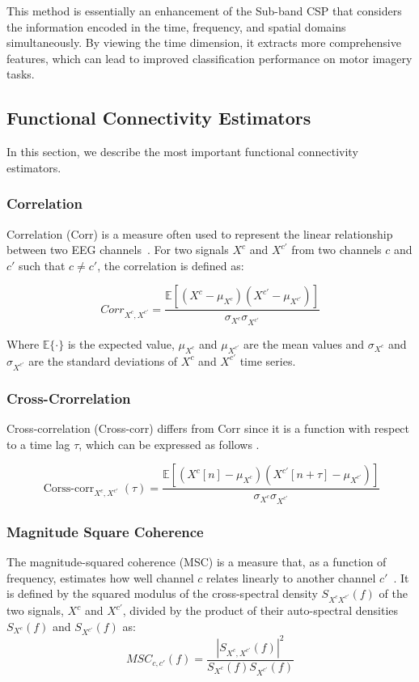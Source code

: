 This method is essentially an enhancement of the Sub-band CSP that considers the information encoded in the time, frequency, and spatial domains simultaneously. By viewing the time dimension, it extracts more comprehensive features, which can lead to improved classification performance on motor imagery tasks.


\subsection{Functional Connectivity Estimators}

In this section, we describe the most important functional connectivity estimators.

\subsubsection{Correlation}
Correlation (Corr) is a measure often used to represent the linear relationship between two EEG channels~\cite{fagerholm2020dynamic}. For two signals $X^{c}$ and $X^{c'}$ from two channels $c$ and $c'$ such that $c\neq c'$, the correlation is defined as:

\begin{equation}
    Corr_{X^{c},X^{c'}} =\frac{\mathbb{E}\left[\left(X^{c}-\mu_{X^{c}}\right)\left(X^{c'}-\mu_{X^{c'}}\right)\right]}{\sigma_{X^{c}} \sigma_{X^{c'}}}
\end{equation}

Where $\mathbb{E}\{\cdot\}$ is the expected value, $\mu_{X^{c}}$ and $\mu_{X^{c'}}$ are the mean values and $\sigma_{X^{c}}$ and $\sigma_{X^{c'}}$ are the standard deviations of $X^{c}$ and $X^{c'}$ time series.

\subsubsection{Cross-Crorrelation}

Cross-correlation (Cross-corr) differs from Corr since it is a function with respect to a time lag $\tau$, which can be expressed as follows \cite{roy2022comparative}.


\begin{equation}
    \operatorname{Corss-corr}_{X^{c},X^{c'}}(\tau)=\frac{\mathbb{E}\left[\left(X^{c}[n]-\mu_{X^{c}}\right)\left(X^{c'}[n+\tau]-\mu_{X^{c'}}\right)\right]}{\sigma_{X^{c}} \sigma_{X^{c'}}}
\end{equation}


\subsubsection{Magnitude Square Coherence}
The magnitude-squared coherence (MSC) is a measure that, as a function of frequency, estimates how well channel $c$ relates linearly to another channel $c'$~\cite{cattai2021phase}. It is defined by the squared modulus of the cross-spectral density $S_{X^{c}X^{c'}}(f)$ of the two signals, $X^{c}$ and $X^{c'}$, divided by the product of their auto-spectral densities $S_{X^{c}}(f)$ and $S_{X^{c'}}(f)$ as:
\begin{equation}
    MSC_{c,c'}(f) = \frac{|S_{X^{c},X^{c'}}(f)|^2}{S_{X^{c}}(f)S_{X^{c'}}(f)}
\end{equation}


